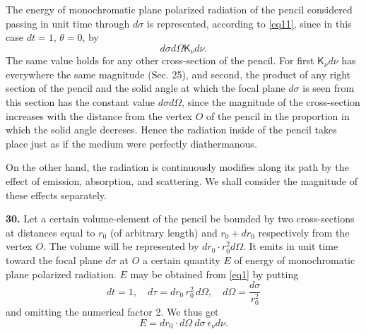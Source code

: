 \documentclass[12pt,oneside]{book}
\begin{document}
The energy of monochromatic plane polarized radiation of the pencil considered passing in unit time through $d\sigma$ is represented, according to \eqref{eq11}, since in this case $dt=1$, $\theta=0$, by
\begin{equation}
    \label{eq30}
    d\sigma d\Omega \mathsf{K}_\nu d\nu.
\end{equation}
The same value holds for any other cross-section of the pencil. For first $\mathsf{K}_\nu d\nu$ has everywhere the same magnitude (Sec. 25), and second, the product of any right section of the pencil and the solid angle at which the focal plane $d\sigma$ is seen from this section has the constant value $d\sigma d\Omega$, since the magnitude of the cross-section increases with the distance from the vertex $O$ of the pencil in the proportion in which the solid angle decreses. Hence the radiation inside of the pencil takes place just as if the medium were perfectly diathermanous. \par

On the other hand, the radiation is continuously modifies along its path by the effect of emission, absorption, and scattering. We shall consider the magnitude of these effects separately. \par

\textbf{30.} Let a certain volume-element of the pencil be bounded by two cross-sections at distances equal to $r_0$ (of arbitrary length) and $r_0+dr_0$ respectively from the vertex $O$. The volume will be represented by $dr_0\cdot r_0^2d\Omega$. It emits in unit time toward the focal plane $d\sigma$ at $O$ a certain quantity $E$ of energy of monochromatic plane polarized radiation. $E$ may be obtained from \eqref{eq1} by putting
\begin{equation*}
    dt=1,\quad d\tau=d r_0\, r_0^2\, d\Omega,\quad d\Omega=\frac{d\sigma}{r_0^2}
\end{equation*}
and omitting the numerical factor 2. We thus get
\begin{equation}
    E=dr_0\cdot d\Omega\ d\sigma\ \epsilon_\nu d\nu.
    \label{eq31}
\end{equation} \par
\end{document}
